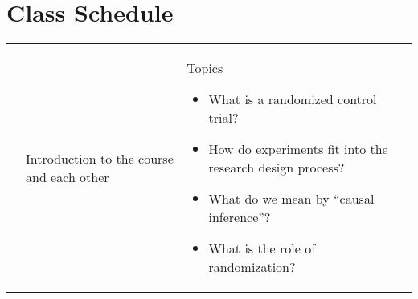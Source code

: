 \documentclass[letterpaper]{inzane_syllabus} %
\begin{document}
\newpage %


\makeFullPage

{} \section{Class Schedule}
\SetDate[07/06/2021]

\begin{center}
    \begin{longtable}{>{\raggedright}p{2.5cm}  @{\hskip 0.5cm} >{\raggedright}p{6cm}>{\raggedright\arraybackslash}p{11cm}}        \arrayrulecolor{myCOLOR}\toprule

        \syldate{\today}  & Introduction to the course and each other & 

        Topics
        \begin{itemize}
            \item What is a randomized control trial?
            \item  How do experiments fit into the research design process?
            \item  What do we mean by ``causal inference''?
            \item   What is the role of randomization?
        \end{itemize}


\end{longtable}
\end{center}
\end{document}
